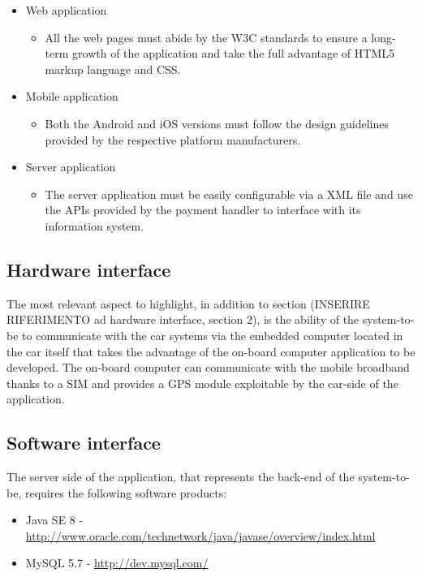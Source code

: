 \begin{itemize}
\item Web application
	\begin{itemize}
	\item[] All the web pages must abide by the W3C standards to ensure a long-term growth of the application and take the full advantage of HTML5 markup language and CSS.
	\end{itemize}
\item Mobile application
	\begin{itemize}
	\item[] Both the Android and iOS versions must follow the design guidelines provided by the respective platform manufacturers.
	\end{itemize}
\item Server application
	\begin{itemize}
	\item[] The server application must be easily configurable via a XML file and use the APIs provided by the payment handler to interface with its information system.
	\end{itemize}
\end{itemize}

\subsection{Hardware interface}
The most relevant aspect to highlight, in addition to section (INSERIRE RIFERIMENTO ad hardware interface, section 2), is the ability of the system-to-be to communicate with the car systems via the embedded computer located in the car itself that takes the advantage of the on-board computer application to be developed. The on-board computer can communicate with the mobile broadband thanks to a SIM and provides a GPS module exploitable by the car-side of the application.

\subsection{Software interface}
The server side of the application, that represents the back-end of the system-to-be, requires the following software products:
\begin{itemize}
\item Java SE 8 - \url{http://www.oracle.com/technetwork/java/javase/overview/index.html}
\item MySQL 5.7 - \url{http://dev.mysql.com/}
\end{itemize}

